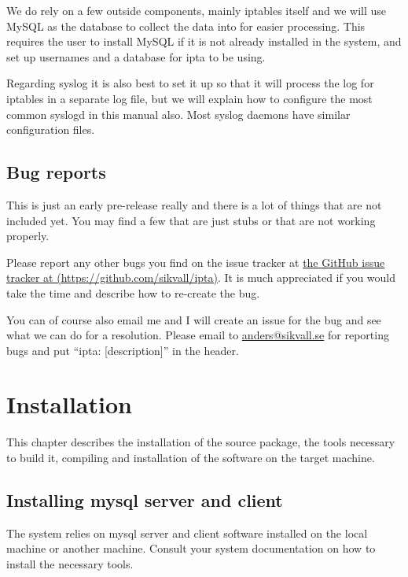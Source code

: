 \documentclass[english,twoside,openright,a4paper,12pt]{article}
\begin{document}
We do rely on a few outside components, mainly iptables itself and we will use MySQL as the database to collect the data into for easier processing. This requires the user to install MySQL if it is not already installed in the system, and set up usernames and a database for ipta to be using.

Regarding syslog it is also best to set it up so that it will process the log for iptables in a separate log file, but we will explain how to configure the most common syslogd in this manual also. Most syslog daemons have similar configuration files.

\subsection{Bug reports}

This is just an early pre-release really and there is a lot of things that are not included yet. You may find a few that are just stubs or that are not working properly.

Please report any other bugs you find on the issue tracker at \hyperref[https://github.com/sikvall/ipta]{the GitHub issue tracker at  (https://github.com/sikvall/ipta)}. It is much appreciated if you would take the time and describe how to re-create the bug.

You can of course also email me and I will create an issue for the bug and see what we can do for a resolution. Please email to \hyperref[mailto:anders@sikvall.se]{anders@sikvall.se} for reporting bugs and put ``ipta: [description]'' in the header.
 

\section{Installation}

This chapter describes the installation of the source package, the tools necessary to build it, compiling and installation of the software on the target machine.

\subsection{Installing mysql server and client}

The system relies on mysql server and client software installed on the local machine or another machine. Consult your system documentation on how to install the necessary tools.
\end{document}
